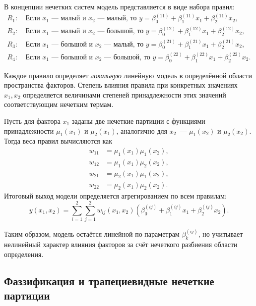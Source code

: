 \documentclass[a4paper,12pt]{article}
\begin{document}
В концепции нечетких систем модель представляется в виде набора правил:
\begin{align}
R_1:&\ \text{Если } x_1 \text{~--- малый и } x_2 \text{~--- малый, то }
      y = \beta_0^{(11)} + \beta_1^{(11)} x_1 + \beta_2^{(11)} x_2, \\
R_2:&\ \text{Если } x_1 \text{~--- малый и } x_2 \text{~--- большой, то }
      y = \beta_0^{(12)} + \beta_1^{(12)} x_1 + \beta_2^{(12)} x_2, \\
R_3:&\ \text{Если } x_1 \text{~--- большой и } x_2 \text{~--- малый, то }
      y = \beta_0^{(21)} + \beta_1^{(21)} x_1 + \beta_2^{(21)} x_2, \\
R_4:&\ \text{Если } x_1 \text{~--- большой и } x_2 \text{~--- большой, то }
      y = \beta_0^{(22)} + \beta_1^{(22)} x_1 + \beta_2^{(22)} x_2.
\end{align}

Каждое правило определяет \emph{локальную} линейную модель в определённой
области пространства факторов. Степень влияния правила при конкретных
значениях $x_1,x_2$ определяется величинами степеней принадлежности
этих значений соответствующим нечетким термам.

Пусть для фактора $x_1$ заданы две нечеткие партиции с функциями
принадлежности $\mu_1(x_1)$ и $\mu_2(x_1)$,
аналогично для $x_2$~--- $\mu_1(x_2)$ и $\mu_2(x_2)$.
Тогда веса правил вычисляются как
\begin{align}
w_{11} &= \mu_1(x_1) \mu_1(x_2), \\
w_{12} &= \mu_1(x_1) \mu_2(x_2), \\
w_{21} &= \mu_2(x_1) \mu_1(x_2), \\
w_{22} &= \mu_2(x_1) \mu_2(x_2).
\end{align}
Итоговый выход модели определяется агрегированием по всем правилам:
\begin{equation}
y(x_1,x_2) =
\sum_{i=1}^{2} \sum_{j=1}^{2}
w_{ij}(x_1,x_2)
\left(
\beta_0^{(ij)} + \beta_1^{(ij)} x_1 + \beta_2^{(ij)} x_2
\right).
\end{equation}

Таким образом, модель остаётся линейной по параметрам
$\beta^{(ij)}_k$, но учитывает нелинейный характер влияния
факторов за счёт нечеткого разбиения области определения.

\subsection{Фаззификация и трапециевидные нечеткие партиции}
\end{document}
